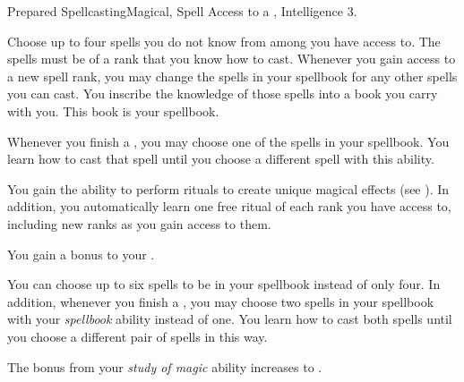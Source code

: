   \begin{magicalfeat}{Prepared Spellcasting}{Magical, Spell}
    \featpre Access to a , Intelligence 3.

     Choose up to four spells you do not know from among  you have access to.
    The spells must be of a rank that you know how to cast.
    Whenever you gain access to a new spell rank, you may change the spells in your spellbook for any other spells you can cast.
    You inscribe the knowledge of those spells into a book you carry with you.
    This book is your spellbook.

    Whenever you finish a , you may choose one of the spells in your spellbook.
    You learn how to cast that spell until you choose a different spell with this ability.

     You gain the ability to perform rituals to create unique magical effects (see ).
    In addition, you automatically learn one free ritual of each rank you have access to, including new ranks as you gain access to them.

     You gain a  bonus to your .

     You can choose up to six spells to be in your spellbook instead of only four.
    In addition, whenever you finish a , you may choose two spells in your spellbook with your \textit{spellbook} ability instead of one.
    You learn how to cast both spells until you choose a different pair of spells in this way.

     The bonus from your \textit{study of magic} ability increases to .
  \end{magicalfeat}

